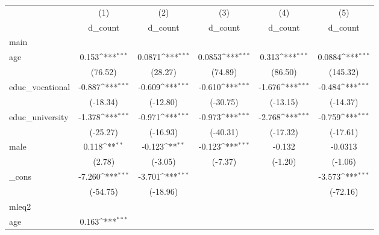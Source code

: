 {
\def\sym#1{\ifmmode^{#1}\else\(^{#1}\)\fi}
\begin{tabular}{l*{5}{c}}
\hline\hline
            &\multicolumn{1}{c}{(1)}&\multicolumn{1}{c}{(2)}&\multicolumn{1}{c}{(3)}&\multicolumn{1}{c}{(4)}&\multicolumn{1}{c}{(5)}\\
            &\multicolumn{1}{c}{d\_count}&\multicolumn{1}{c}{d\_count}&\multicolumn{1}{c}{d\_count}&\multicolumn{1}{c}{d\_count}&\multicolumn{1}{c}{d\_count}\\
\hline
main        &                     &                     &                     &                     &                     \\
age         &       0.153\sym{***}&      0.0871\sym{***}&      0.0853\sym{***}&       0.313\sym{***}&      0.0884\sym{***}\\
            &     (76.52)         &     (28.27)         &     (74.89)         &     (86.50)         &    (145.32)         \\
[1em]
educ\_vocational&      -0.887\sym{***}&      -0.609\sym{***}&      -0.610\sym{***}&      -1.676\sym{***}&      -0.484\sym{***}\\
            &    (-18.34)         &    (-12.80)         &    (-30.75)         &    (-13.15)         &    (-14.37)         \\
[1em]
educ\_university&      -1.378\sym{***}&      -0.971\sym{***}&      -0.973\sym{***}&      -2.768\sym{***}&      -0.759\sym{***}\\
            &    (-25.27)         &    (-16.93)         &    (-40.31)         &    (-17.32)         &    (-17.61)         \\
[1em]
male        &       0.118\sym{**} &      -0.123\sym{**} &      -0.123\sym{***}&      -0.132         &     -0.0313         \\
            &      (2.78)         &     (-3.05)         &     (-7.37)         &     (-1.20)         &     (-1.06)         \\
[1em]
\_cons      &      -7.260\sym{***}&      -3.701\sym{***}&                     &                     &      -3.573\sym{***}\\
            &    (-54.75)         &    (-18.96)         &                     &                     &    (-72.16)         \\
\hline
mleq2       &                     &                     &                     &                     &                     \\
age         &       0.163\sym{***}&                     &                     &                     &                     \\

\end{tabular}}
